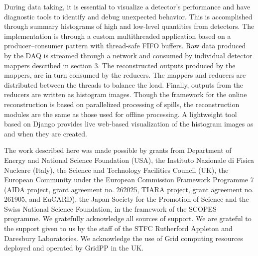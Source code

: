\documentclass{JINST}
\begin{document}

During data taking, it is essential to visualize a detector's performance and have diagnostic tools to identify and debug unexpected behavior. This is accomplished through summary histograms of  high and low-level quantities from detectors. The implementation is through a custom multithreaded application based on a producer--consumer pattern with thread-safe FIFO buffers. Raw data produced by the DAQ is streamed through a network and consumed by individual detector mappers described in section 3. The reconstructed outputs produced by the mappers,  are in turn consumed by the reducers. The mappers and reducers are distributed between the threads to balance the load. Finally,  outputs from the reducers are written as histogram images. Though the framework for the online reconstruction is based on parallelized processing of spills, the reconstruction modules are the same as those used for offline processing. A lightweight tool based on Django \cite{Django} provides live web-based visualization of the histogram images as and when they are created.





\acknowledgments

The work described here was made possible by grants from Department of Energy and National Science Foundation
(USA), the Instituto Nazionale di Fisica Nucleare (Italy), the Science and Technology Facilities Council
(UK), the European Community under the European Commission Framework Programme 7 (AIDA project,
grant agreement no. 262025, TIARA project, grant agreement no. 261905, and EuCARD), the Japan Society
for the Promotion of Science and the Swiss National Science Foundation, in the framework of the SCOPES
programme. We gratefully acknowledge all sources of support. We are grateful to the support given to us
by the staff of the STFC Rutherford Appleton and Daresbury Laboratories. We acknowledge the use of Grid
computing resources deployed and operated by GridPP \cite{GridPP} in the UK.
\end{document}
